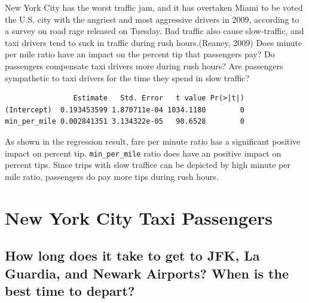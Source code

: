 \documentclass[12pt,twoside]{reedthesis}
\theoremstyle{definition}
\theoremstyle{definition}
\theoremstyle{definition}
\theoremstyle{remark}
\begin{document}
New York City has the worst traffic jam, and it has overtaken Miami to
be voted the U.S. city with the angriest and most aggressive drivers in
2009, according to a survey on road rage released on Tuesday. Bad
traffic also cause slow-traffic, and taxi drivers tend to suck in
traffic during rush hours.(Reaney, 2009) Does minute per mile ratio have
an impact on the percent tip that passengers pay? Do passengers
compensate taxi drivers more during rush hours? Are passengers
sympathetic to taxi drivers for the time they spend in slow traffic?
\begin{verbatim}
                Estimate   Std. Error   t value Pr(>|t|)
(Intercept)  0.193453599 1.870711e-04 1034.1180        0
min_per_mile 0.002841351 3.134322e-05   90.6528        0
\end{verbatim}
As shown in the regression result, fare per minute ratio has a
significant positive impact on percent tip. \texttt{min\_per\_mile}
ratio does have an positive impact on percent tips. Since trips with
slow traffice can be depicted by high minute per mile ratio, passengers
do pay more tips during rush hours.

\chapter{New York City Taxi Passengers}\label{chapter4}

\section{How long does it take to get to JFK, La Guardia, and Newark
Airports? When is the best time to
depart?}\label{how-long-does-it-take-to-get-to-jfk-la-guardia-and-newark-airports-when-is-the-best-time-to-depart}
\end{document}
